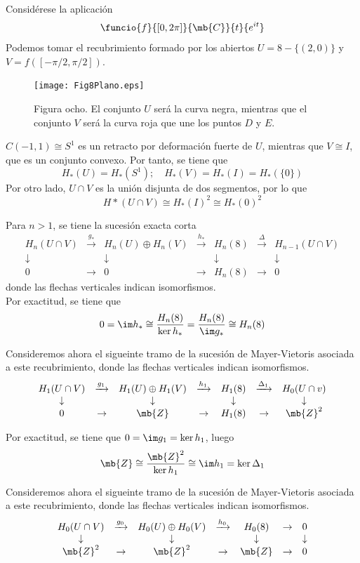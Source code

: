 Considérese la aplicación $$\funcio{f}{[0,2\pi]}{\mb{C}}{t}{e^{it}}$$ Podemos tomar el recubrimiento formado por los abiertos $U=8-\{(2,0)\}$ y $V=f([-\pi/2,\pi/2])$.
\\

\begin{figure}[h]
\centering
\texttt{[image: Fig8Plano.eps]}
\caption{Figura ocho. El conjunto $U$ será la curva negra, mientras que el conjunto $V$ será la curva roja que une los puntos $D$ y $E$.}
\end{figure}

$C(-1,1)\cong S^1$ es un retracto por deformación fuerte de $U$, mientras que $V \cong I$, que es un conjunto convexo. Por tanto, se tiene que $$H_*(U)=H_*(S^1); \quad H_*(V)=H_*(I)=H_*(\{0\})$$ Por otro lado, $U \cap V$ es la unión disjunta de dos segmentos, por lo que $$H*(U \cap V)\cong H_*(I)^2 \cong H_*(0)^2$$

Para $n > 1$, se tiene la sucesión exacta corta
\[\begin{array}{ccccccc}
H_n(U \cap V)	&\xrightarrow{g_*}	&H_n(U)\oplus H_n(V)	&\xrightarrow{h_*}	&H_n(8)		&\xrightarrow{\Delta}&H_{n-1}(U \cap V)\\
\downarrow		&					&\downarrow			&					&\downarrow	&					&\downarrow\\
0		&\rightarrow			&0			&\rightarrow			&H_n(8)		&\rightarrow			&0
\end{array}\]
donde las flechas verticales indican isomorfismos.
\\

Por exactitud, se tiene que
$$0=\im h_*\cong \frac{H_n(8)}{\ker h_*}=\frac{H_n(8)}{\im g_*}\cong H_n(8)$$

Consideremos ahora el sigueinte tramo de la sucesión de Mayer-Vietoris asociada a este recubrimiento, donde las flechas verticales indican isomorfismos.
\[\begin{array}{ccccccc}
H_1(U \cap V)	&\xrightarrow{g_1}	&H_1(U)\oplus H_1(V)	&\xrightarrow{h_1}	&H_1(8)		&\xrightarrow{\Delta_1}&H_0(U \cap v)\\
\downarrow		&					&\downarrow			&					&\downarrow	&					&\downarrow\\
0		&\rightarrow			&\mb{Z}			&\rightarrow			&H_1(8)		&\rightarrow			&\mb{Z}^2
\end{array}\]

Por exactitud, se tiene que $0=\im g_1=\ker h_1$, luego $$\mb{Z} \cong \frac{\mb{Z}^2}{\ker h_1} \cong \im h_1 =\ker \Delta_1$$

Consideremos ahora el sigueinte tramo de la sucesión de Mayer-Vietoris asociada a este recubrimiento, donde las flechas verticales indican isomorfismos.
\[\begin{array}{ccccccc}
H_0(U \cap V)	&\xrightarrow{g_0}	&H_0(U)\oplus H_0(V)	&\xrightarrow{h_0}	&H_0(8)		&\rightarrow&0\\
\downarrow		&					&\downarrow			&					&\downarrow	&					&\downarrow\\
\mb{Z}^2		&\rightarrow			&\mb{Z}^2			&\rightarrow			&\mb{Z}		&\rightarrow			&0
\end{array}\]

